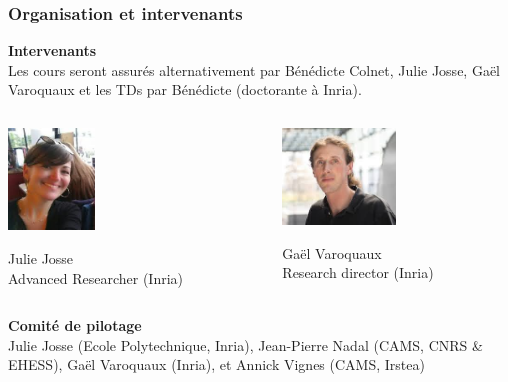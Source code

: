 \documentclass[10pt]{beamer}
\begin{document}
\frame
{ \frametitle{Organisation et intervenants}
\textbf{Intervenants}\\


Les cours seront assurés alternativement par Bénédicte Colnet, Julie Josse, Gaël Varoquaux et les TDs par Bénédicte (doctorante à Inria).

\vspace{0.5cm}
\begin{columns}
\begin{column}{.45\linewidth}\centering
\includegraphics[width=2.3cm]{juliejosse}\par 
Julie Josse \\ Advanced Researcher (Inria)
\end{column}
\begin{column}{.45\linewidth}\centering
\includegraphics[width=3cm]{gaelvaroquaux}\par 
Gaël Varoquaux\\ Research director (Inria)
\end{column}

\end{columns}


\textbf{Comité de pilotage}\\
Julie Josse (Ecole Polytechnique, Inria), Jean-Pierre Nadal (CAMS, CNRS \& EHESS), Gaël Varoquaux (Inria), et Annick Vignes (CAMS,  Irstea)
}
\end{document}
